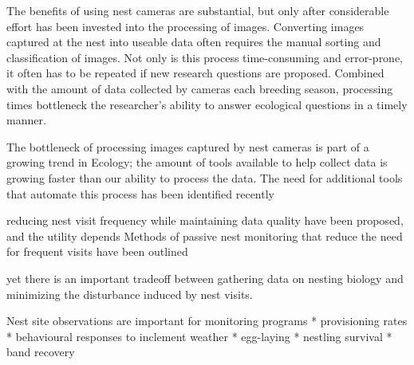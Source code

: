  
 
 
 
The benefits of using nest cameras are substantial, but only after considerable effort has been invested into the processing of images.
Converting images captured at the nest into useable data often requires the manual sorting and classification of images.
Not only is this process time-consuming and error-prone, it often has to be repeated if new research questions are proposed.
Combined with the amount of data collected by cameras each breeding season, processing times bottleneck the researcher's ability to answer ecological questions in a timely manner.

 
 
 
 
The bottleneck of processing images captured by nest cameras is part of a growing trend in Ecology; the amount of tools available to help collect data is growing faster than our ability to process the data. 
The need for additional tools that automate this process has been identified recently

reducing nest visit frequency while maintaining data quality have been proposed, and the utility depends Methods of passive nest monitoring that reduce the need for frequent visits have been outlined


yet there is an important tradeoff between gathering data on nesting biology and minimizing the disturbance induced by nest visits.

Nest site observations are important for monitoring programs
* provisioning rates
* behavioural responses to inclement weather
* egg-laying
* nestling survival
* band recovery


 

 
 






